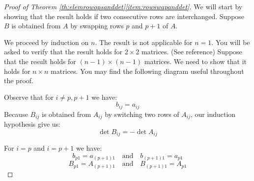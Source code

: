 \documentclass{ximera}
\begin{document}
\begin{proof}[Proof of Theorem \ref{th:elemrowopsanddet}\ref{item:rowswapanddet}] We will start by showing that the result holds if two consecutive rows are interchanged.  Suppose $B$ is obtained from $A$ by swapping rows $p$ and $p+1$ of $A$. 

We proceed by induction on $n$.  The result is not applicable for $n=1$.  You will be asked to verify that the result holds for $2\times 2$ matrices. (See {\color{red} reference})  Suppose that the result holds for $(n-1)\times (n-1)$ matrices.  We need to show that it holds for $n\times n$ matrices.
You may find the following diagram useful throughout the proof.
\begin{center}
 \end{center} 
 Observe that for $i\neq p, p+1$ we have: $$b_{ij}=a_{ij}$$ Because $B_{ij}$ is obtained from $A_{ij}$ by switching two rows of $A_{ij}$, our induction hypothesis give us:
 $$\det{B_{ij}}=-\det{A_{ij}}$$
 
 For $i=p$ and $i=p+1$ we have:
 $$b_{p1}=a_{(p+1)1}\quad\text{and}\quad b_{(p+1)1}=a_{p1}$$
 $$B_{p1}=A_{(p+1)1}\quad\text{and}\quad B_{(p+1)1}=A_{p1}$$
 

\end{proof}
\end{document}
